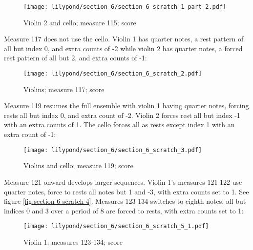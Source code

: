 \setcounter{figure}{35}
\setcounter{subFigure}{3}
\begin{figure}[H]
    \texttt{[image: lilypond/section\_6/section\_6\_scratch\_1\_part\_2.pdf]}
     \caption{Violin 2 and cello; measure 115; score}
    \label{fig:section-6-scratch-1-3}
\end{figure}

Measure 117  does not use the cello. Violin 1 has quarter notes, a rest pattern of all but index 0, and extra counts of -2 while violin 2 has quarter notes, a forced rest pattern of all but 2, and extra counts of -1:

\setcounter{figure}{36}
\setcounter{subFigure}{0}
\renewcommand{\thefigure}{\thechapter.\arabic{figure}}
\begin{figure}[H]
    \texttt{[image: lilypond/section\_6/section\_6\_scratch\_2.pdf]}
     \caption{Violins; measure 117; score}
    \label{fig:section-6-scratch-2}
\end{figure}

Measure 119 resumes the full ensemble with violin 1 having quarter notes, forcing rests all but index 0, and extra count of -2. Violin 2 forces rest all but index -1 with an extra counts of 1. The cello forces all as rests except index 1 with an extra count of -1:

\setcounter{figure}{37}
\begin{figure}[H]
    \texttt{[image: lilypond/section\_6/section\_6\_scratch\_3.pdf]}
     \caption{Violins and cello; measure 119; score}
    \label{fig:section-6-scratch-3}
\end{figure}


Measure 121 onward develops larger sequences. Violin 1's measures 121-122 use quarter notes, force to rests all notes but 1 and -3, with extra counts set to 1. See figure \ref{fig:section-6-scratch-4}. Measures 123-134 switches to eighth notes, all but indices 0 and 3 over a period of 8 are forced to rests, with extra counts set to 1:

\setcounter{figure}{38}
\begin{figure}[H]
    \texttt{[image: lilypond/section\_6/section\_6\_scratch\_5\_1.pdf]}
     \caption{Violin 1; measures 123-134; score}
    \label{fig:section-6-scratch-5-1}
\end{figure}

